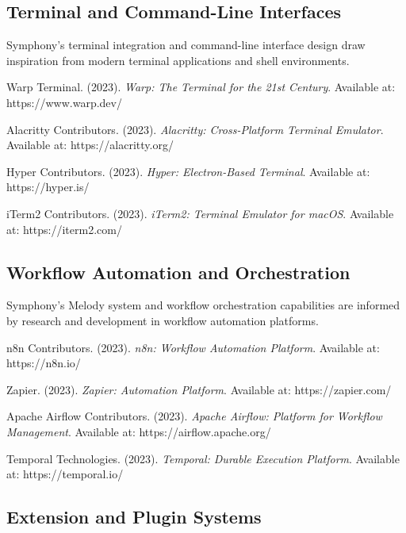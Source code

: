 \subsection*{Terminal and Command-Line Interfaces}

Symphony's terminal integration and command-line interface design draw inspiration from modern terminal applications and shell environments.

\begin{compactlist}
    \item Warp Terminal. (2023). \textit{Warp: The Terminal for the 21st Century}. Available at: https://www.warp.dev/
    \item Alacritty Contributors. (2023). \textit{Alacritty: Cross-Platform Terminal Emulator}. Available at: https://alacritty.org/
    \item Hyper Contributors. (2023). \textit{Hyper: Electron-Based Terminal}. Available at: https://hyper.is/
    \item iTerm2 Contributors. (2023). \textit{iTerm2: Terminal Emulator for macOS}. Available at: https://iterm2.com/
\end{compactlist}

\subsection*{Workflow Automation and Orchestration}

Symphony's Melody system and workflow orchestration capabilities are informed by research and development in workflow automation platforms.

\begin{compactlist}
    \item n8n Contributors. (2023). \textit{n8n: Workflow Automation Platform}. Available at: https://n8n.io/
    \item Zapier. (2023). \textit{Zapier: Automation Platform}. Available at: https://zapier.com/
    \item Apache Airflow Contributors. (2023). \textit{Apache Airflow: Platform for Workflow Management}. Available at: https://airflow.apache.org/
    \item Temporal Technologies. (2023). \textit{Temporal: Durable Execution Platform}. Available at: https://temporal.io/
\end{compactlist}

\subsection*{Extension and Plugin Systems}

